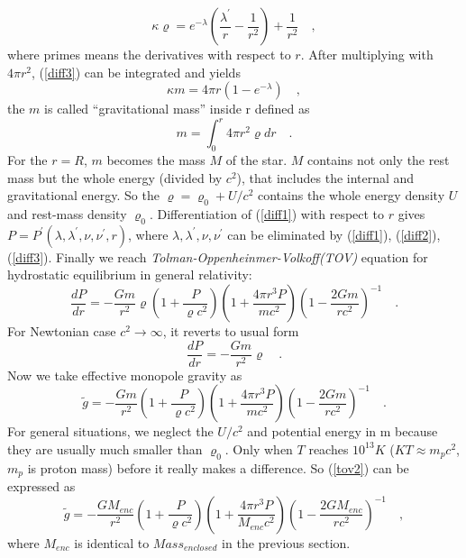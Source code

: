 \begin{equation}\label{diff3}
  \kappa \varrho =
  e^{-\lambda}(\frac{\lambda^{\prime}}{r}-\frac{1}{r^{2}})+\frac{1}{r^{2}} \quad ,
\end{equation} 
where primes means the derivatives with respect to $r$. After multiplying with $4\pi r^2$, (\ref{diff3}) can 
be integrated and yields
\begin{equation}\label{gmass1}
  \kappa m = 4\pi r (1-e^{-\lambda}) \quad ,
\end{equation}
the $m$ is called ``gravitational mass'' inside r defined as
\begin{equation}\label{gmass2}
  m = \int_{0}^{r}4\pi r^{2}  \varrho dr\quad .
\end{equation}      
For the $r = R$, $m$ becomes the mass $M$ of the star. $M$ contains not only the rest mass but
the whole energy (divided by $c^2$), that includes the internal and gravitational energy. So the
 $\varrho = \varrho_0 +U/c^2$ contains the whole energy density $U$ and rest-mass density $\varrho_0$. 
Differentiation of (\ref{diff1}) with respect to $r$ gives $P = P^{\prime}(\lambda,\lambda^{\prime},
\nu,\nu^{\prime},r)$, where $\lambda,\lambda^{\prime},\nu,\nu^{\prime}$  can be eliminated by (\ref{diff1}), 
(\ref{diff2}), (\ref{diff3}). Finally we reach \textit{Tolman-Oppenheinmer-Volkoff(TOV)} equation for 
hydrostatic equilibrium in general relativity:
\begin{equation}\label{tov}
  \frac{dP}{dr} = -\frac{Gm}{r^{2}}\varrho (1+\frac{P}{\varrho
    c^{2}})(1+\frac{4\pi r^3 P}{m c^{2}}) (1-\frac{2Gm}{r c^{2}})^{-1} \quad .
\end{equation}                  
For Newtonian case $c^2 \rightarrow  \infty $, it reverts to usual form
\begin{equation}\label{newton}
  \frac{dP}{dr} = -\frac{Gm}{r^{2}}\varrho \quad .
\end{equation}
Now we take effective monopole gravity as
\begin{equation}\label{tov2}                                                      
\tilde{g} = -\frac{Gm}{r^{2}} (1+\frac{P}{\varrho
  c^{2}})(1+\frac{4\pi r^3 P}{m c^{2}}) (1-\frac{2Gm}{r c^{2}})^{-1}  \quad .
\end{equation}                                 
For general situations, we neglect the $U/c^2$ and potential energy in m because they are usually
much smaller than $\varrho_0$. Only when $T$ reaches $10^{13} K$ ($KT \approx m_{p} c^2$, $m_p$ is proton mass)
 before it really makes a difference. So (\ref{tov2}) can be expressed as
\begin{equation}\label{tov3}                                                      
  \tilde{g} = -\frac{GM_{enc}}{r^{2}} (1+\frac{P}{\varrho
    c^{2}})(1+\frac{4\pi r^3 P}{M_{enc} c^{2}}) (1-\frac{2GM_{enc}}{r c^{2}})^{-1} \quad ,
\end{equation}                                              
where $M_{enc}$ is identical to $Mass_{enclosed}$ in the previous section.
